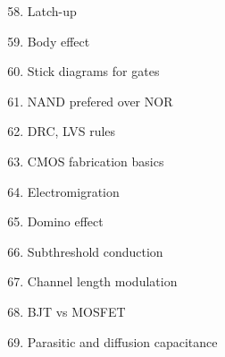 \documentclass[main.tex]{subfiles}
\begin{document}
\begin{enumerate}
    \setcounter{enumi}{57}
    \item Latch-up
    \item Body effect
    \item Stick diagrams for gates
    \item NAND prefered over NOR
    \item DRC, LVS rules
    \item CMOS fabrication basics
    \item Electromigration
    \item Domino effect
    \item Subthreshold conduction
    \item Channel length modulation
    \item BJT vs MOSFET
    \item Parasitic and diffusion capacitance
\end{enumerate}
\end{document}
